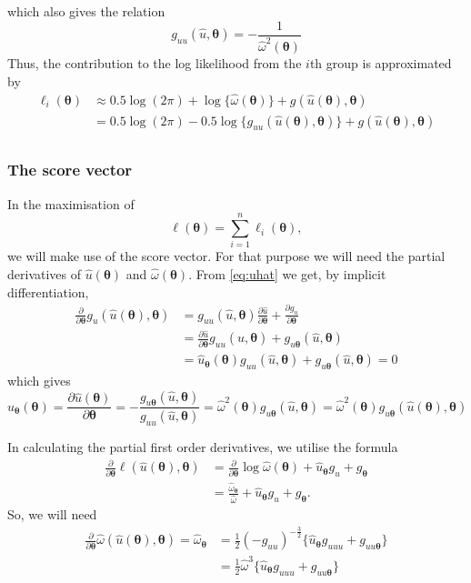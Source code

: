 \documentclass[a4paper,11pt]{article}
\newcommand{\btheta}{\ensuremath{\boldsymbol{\theta}}}
\newcommand{\be}{\begin{equation}}
\newcommand{\ee}{\end{equation}}
\begin{document}
which also gives the relation
\be
g_{uu}(\hat{u}, \btheta) = - \frac{1}{\hat{\omega}^2(\btheta)}
\ee
Thus, the contribution to the log likelihood from the $i$th group is
approximated by
\begin{equation}\label{eq:laplik}
\begin{split}
\ell_i(\btheta) &\approx 0.5 \log(2 \pi) + \log\{\hat{\omega}(\btheta)\} +
g(\hat{u}(\btheta), \btheta) \\
&= 0.5 \log(2 \pi) -0.5 \log\{g_{uu}(\hat{u}(\btheta), \btheta)\} +
g(\hat{u}(\btheta), \btheta) \\
\end{split} 
\end{equation}

\subsubsection{The score vector}

In the maximisation of 
\begin{equation*}
\ell(\btheta) = \sum_{i=1}^n \ell_i(\btheta),
\end{equation*}
we will make use of the score vector. For that purpose we will need the partial
derivatives of $\hat{u}(\btheta)$ and $\hat{\omega}(\btheta)$. From \eqref{eq:uhat} we get, by implicit
differentiation, 
\be\label{eq:uhatprim}
\begin{split}
\frac{\partial}{\partial \btheta} g_u(\hat{u}(\btheta), \btheta) &=
g_{uu}(\hat{u}, \btheta) \frac{\partial \hat{u}}{\partial \btheta}  +
\frac{\partial g_u}{\partial \btheta}\\
 &= \frac{\partial \hat{u}}{\partial \btheta}  
g_{uu}(\hat{u}, \btheta) +
g_{u\btheta}(\hat{u}, \btheta) \\
&= \hat{u}_{\btheta}(\btheta) g_{uu}(\hat{u}, \btheta) + g_{u\btheta}(\hat{u},
\btheta) = 0  
\end{split}
\ee
 which gives
\be
\hat{u}_{\btheta}(\btheta) = \frac{\partial \hat{u}(\btheta)}{\partial
  \btheta} =  
-\frac{g_{u\btheta}(\hat{u}, \btheta)}{g_{uu}(\hat{u}, \btheta)}
= \hat{\omega}^2(\btheta) g_{u\btheta}(\hat{u}, \btheta) = 
\hat{\omega}^2(\btheta) g_{u\btheta}(\hat{u}(\btheta), \btheta) 
\ee

In calculating the partial first order derivatives, we utilise the formula
\be\label{eq:imp}
\begin{split}
\frac{\partial}{\partial \btheta} \ell(\hat{u}(\btheta), \btheta) &=
\frac{\partial}{\partial \btheta}\log\hat{\omega}(\btheta) +
\hat{u}_{\btheta} g_u  + g_{\btheta}\\
&= \frac{\hat\omega_{\btheta}}{\hat{\omega}} +
\hat{u}_{\btheta} g_u  + g_{\btheta}.
\end{split}
\ee 
So, we will need
\be
\begin{split}
\frac{\partial}{\partial \btheta} \hat{\omega}({\hat{u}}(\btheta), \btheta) = \hat{\omega}_{\btheta} &= 
\frac{1}{2} (-g_{uu})^{-\frac{3}{2}}\{\hat{u}_{\btheta}g_{uuu} +
g_{uu\btheta}\} \\
&= \frac{1}{2} \hat{\omega}^3 \{\hat{u}_{\btheta}g_{uuu} +
g_{uu\btheta}\}  
\end{split}
\ee
\end{document}
